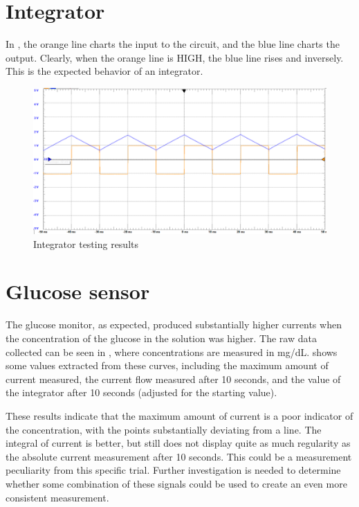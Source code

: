 \documentclass[11pt]{article} %
\begin{document}
\section{Integrator }

In , the orange line charts the input to the circuit, and the blue line charts the output. Clearly, when the orange line is HIGH, the blue line rises and inversely. This is the expected behavior of an integrator.

\begin{figure}[H]
	\centering
	\includegraphics[width=\textwidth]{integrator.png}
	\caption{Integrator testing results}
 	\label{fig:integrate}
\end{figure}



\section{Glucose sensor}


 The glucose monitor, as expected, produced substantially higher currents when the concentration of the glucose in the solution was higher. The raw data collected can be seen in
 , where concentrations are measured in mg/dL.  shows some values extracted from these curves, including the maximum amount of current measured, the current flow measured after 10 seconds, and the value of the integrator after 10 seconds (adjusted for the starting value).
 
 These results indicate that the maximum amount of current is a poor indicator of the concentration, with the points substantially deviating from a line. The integral of current is better, but still does not display quite as much regularity as the absolute current measurement after 10 seconds. This could be a measurement peculiarity from this specific trial. Further investigation is needed to determine whether some combination of these signals could be used to create an even more consistent measurement.
\end{document}
